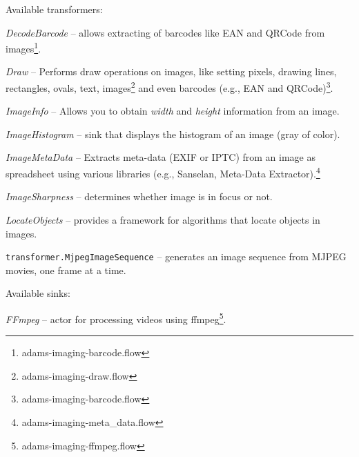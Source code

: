 \documentclass[a4paper]{book}
\begin{document}
\noindent Available transformers:
\begin{tight_itemize}
	\item \textit{DecodeBarcode} -- allows extracting of barcodes like
	EAN and QRCode from images\footnote{adams-imaging-barcode.flow}.
	\item \textit{Draw} -- Performs draw operations on images, like setting
	pixels, drawing lines, rectangles, ovals, text, images\footnote{adams-imaging-draw.flow}
	and even barcodes (e.g., EAN and QRCode)\footnote{adams-imaging-barcode.flow}.
	\item \textit{ImageInfo} -- Allows you to obtain \textit{width} and
	\textit{height} information from an image.
	\item \textit{ImageHistogram} -- sink that displays the histogram of an image
	(gray of color).
	\item \textit{ImageMetaData} -- Extracts meta-data (EXIF or IPTC) from an
	image as spreadsheet using various libraries (e.g., Sanselan\cite{sanselan}, 
	Meta-Data Extractor\cite{metadataextractor}).\footnote{adams-imaging-meta\_data.flow}
	\item \textit{ImageSharpness} -- determines whether image is in focus or not.
	\item \textit{LocateObjects} -- provides a framework for algorithms that
	locate objects in images.
	\item \texttt{transformer.MjpegImageSequence} -- generates an image sequence
	from MJPEG movies, one frame at a time.
\end{tight_itemize}

\noindent Available sinks:
\begin{tight_itemize}
  \item \textit{FFmpeg} -- actor for processing videos using
  ffmpeg\cite{ffmpeg}\footnote{adams-imaging-ffmpeg.flow}.
\end{tight_itemize}



\end{document}
